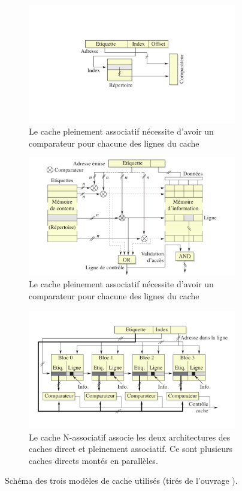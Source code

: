 \begin{figure}
    \begin{subfigure}[t]{\linewidth}\centering
        \includegraphics[width=0.7\linewidth, trim = 0cm 10cm 0cm 2cm]{images/cache_circuit-direct.png}
        \caption{Le cache pleinement associatif nécessite d'avoir un comparateur pour chacune des lignes du cache}
        \label{pic:cache_circuit-direct}
        \vspace{1cm}
    \end{subfigure}
    
    \begin{subfigure}[t]{\linewidth}\centering
        \includegraphics[width=0.7\linewidth]{images/cache_circuit-fully-associative.png}
        \caption{Le cache pleinement associatif nécessite d'avoir un comparateur pour chacune des lignes du cache}
        \label{pic:cache_circuit-fully-associative}
        \vspace{.5cm}
    \end{subfigure}
    
    \begin{subfigure}[t]{\linewidth}\centering
        \includegraphics[width=0.7\linewidth]{images/cache_circuit-set-associative.png}
        \caption{Le cache N-associatif associe les deux architectures des caches direct et pleinement associatif. Ce sont plusieurs caches directs montés en parallèles.}
        \label{pic:cache_circuit-set-associative}
    \end{subfigure}
    
    \caption{Schéma des trois modèles de cache utilisés (tirés de l'ouvrage \cite{Blanchet2013}).}\label{fig:cache_schema}
\end{figure}
